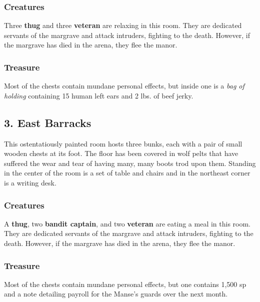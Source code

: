 \documentclass[10pt,a4paper,twoside,bg=print,twocolumn,openany,nodeprecatedcode]{dndbook}
\begin{document}
\subsubsection{Creatures}
Three \textbf{thug} and three \textbf{veteran} are relaxing in this room. They are dedicated servants of the margrave and attack intruders, fighting to the death. However, if the margrave has died in the arena, they flee the manor.

\subsubsection{Treasure}
Most of the chests contain mundane personal effects, but inside one is a \textit{bag of holding} containing 15 human left ears and 2 lbs. of beef jerky.

\subsection{3. East Barracks}
\begin{DndReadAloud}{}
This ostentatiously painted room hosts three bunks, each with a pair of small wooden chests at its foot. The floor has been covered in wolf pelts that have suffered the wear and tear of having many, many boots trod upon them. Standing in the center of the room is a set of table and chairs and in the northeast corner is a writing desk.

\end{DndReadAloud}

\subsubsection{Creatures}
A \textbf{thug}, two \textbf{bandit captain}, and two \textbf{veteran} are eating a meal in this room. They are dedicated servants of the margrave and attack intruders, fighting to the death. However, if the margrave has died in the arena, they flee the manor.

\subsubsection{Treasure}
Most of the chests contain mundane personal effects, but one contains 1,500 sp and a note detailing payroll for the Manse's guards over the next month.
\end{document}

